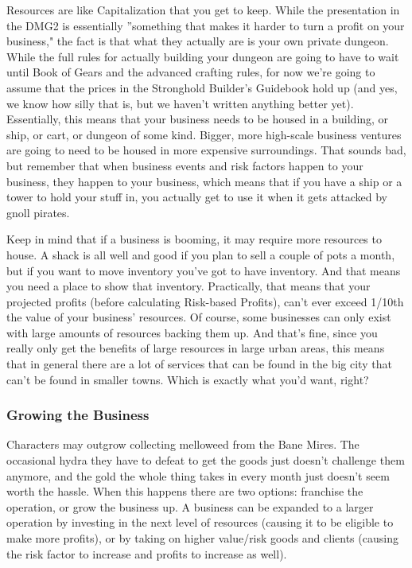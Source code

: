 Resources are like Capitalization that you get to keep. While the presentation in the DMG2 is essentially ''something that makes it harder to turn a profit on your business," the fact is that what they actually are is your own private dungeon. While the full rules for actually building your dungeon are going to have to wait until Book of Gears and the advanced crafting rules, for now we're going to assume that the prices in the Stronghold Builder's Guidebook hold up (and yes, we know how silly that is, but we haven't written anything better yet). Essentially, this means that your business needs to be housed in a building, or ship, or cart, or dungeon of some kind. Bigger, more high-scale business ventures are going to need to be housed in more expensive surroundings. That sounds bad, but remember that when business events and risk factors happen to your business, they happen to your business, which means that if you have a ship or a tower to hold your stuff in, you actually get to use it when it gets attacked by gnoll pirates.

Keep in mind that if a business is booming, it may require more resources to house. A shack is all well and good if you plan to sell a couple of pots a month, but if you want to move inventory you've got to have inventory. And that means you need a place to show that inventory. Practically, that means that your projected profits (before calculating Risk-based Profits), can't ever exceed 1/10th the value of your business' resources. Of course, some businesses can only exist with large amounts of resources backing them up. And that's fine, since you really only get the benefits of large resources in large urban areas, this means that in general there are a lot of services that can be found in the big city that can't be found in smaller towns. Which is exactly what you'd want, right?

\subsubsection{Growing the Business}

Characters may outgrow collecting melloweed from the Bane Mires. The occasional hydra they have to defeat to get the goods just doesn't challenge them anymore, and the gold the whole thing takes in every month just doesn't seem worth the hassle. When this happens there are two options: franchise the operation, or grow the business up. A business can be expanded to a larger operation by investing in the next level of resources (causing it to be eligible to make more profits), or by taking on higher value/risk goods and clients (causing the risk factor to increase and profits to increase as well).

